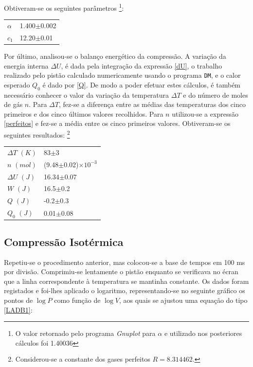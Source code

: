 \documentclass[9pt]{extarticle}
\begin{document}
\begin{multicols}{2}
\par Obtiveram-se os seguintes parâmetros \footnote{O valor retornado pelo programa {\it Gnuplot} para $\alpha$ e utilizado nos posteriores cálculos foi 1.40036}:

\begin{center}
\begin{tabular}{ x{1cm} x{2.5cm} }
\hline \hline
$\alpha$ & 1.400$\pm$0.002 \tabularnewline
$c_1$ & 12.20$\pm$0.01 \tabularnewline
\hline \hline
\end{tabular}
\end{center}

\par Por último, analisou-se o balanço energético da compressão. A variação da energia interna $\Delta U$, é dada pela integração da expressão \eqref{dU}, o trabalho realizado pelo pistão calculado numericamente usando o programa \verb|DM|, e o calor esperado $Q_0$ é dado por \eqref{Q}. De modo a poder efetuar estes cálculos, é também necessário conhecer o valor da variação da temperatura $\Delta T$ e do número de moles de gás $n$. Para $\Delta T$, fez-se a diferença entre as médias das temperaturas dos cinco primeiros e dos cinco últimos valores recolhidos. Para $n$ utilizou-se a expressão \eqref{perfeitos} e fez-se a média entre os cinco primeiros valores. Obtiveram-se os seguintes resultados: \footnote{Considerou-se a constante dos gases perfeitos $R=8.314462$.}

\begin{center}
\begin{tabular}{ x{2cm} x{3cm} }
\hline \hline
$\Delta T$ $(K)$ & 83$\pm$3 \tabularnewline
$n$ $(mol)$ & (9.48$\pm$0.02)$\times10^{-3}$ \tabularnewline
$\Delta U$ $(J)$ & 16.34$\pm$0.07 \tabularnewline
$W$ $(J)$ & 16.5$\pm$0.2 \tabularnewline
$Q$ $(J)$ & -0.2$\pm$0.3 \tabularnewline
$Q_0$ $(J)$ & 0.01$\pm$0.08 \tabularnewline
\hline \hline
\end{tabular}
\end{center}

\subsection*{Compressão Isotérmica}

\par Repetiu-se o procedimento anterior, mas colocou-se a base de tempos em 100 ms por divisão. Comprimiu-se lentamente o pistão enquanto se verificava no écran que a linha correspondente à temperatura se mantinha constante. Os dados foram registados e foi-lhes aplicado o logaritmo, representando-se no seguinte gráfico os pontos de $\log{P}$ como função de $\log{V}$, aos quais se ajustou uma equação do tipo \eqref{LADB1}:


\end{multicols}
\end{document}
